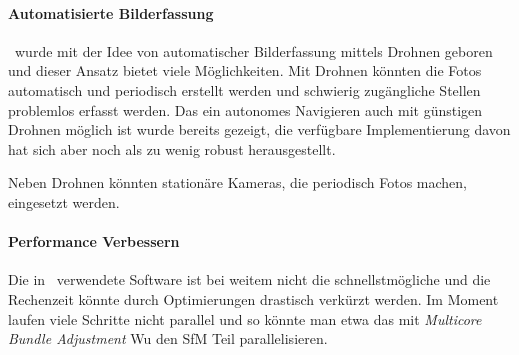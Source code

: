 		\paragraph{Automatisierte Bilderfassung}
			\dronarch\ wurde mit der Idee von automatischer Bilderfassung mittels Drohnen geboren und dieser Ansatz bietet viele Möglichkeiten. Mit Drohnen könnten die Fotos automatisch und periodisch erstellt werden und schwierig zugängliche Stellen problemlos erfasst werden. Das ein autonomes Navigieren auch mit günstigen Drohnen möglich ist wurde bereits gezeigt, die verfügbare Implementierung davon hat sich aber noch als zu wenig robust herausgestellt.
			
			Neben Drohnen könnten stationäre Kameras, die periodisch Fotos machen, eingesetzt werden.

		\paragraph{Performance Verbessern}
			Die in \dronarch\ verwendete Software ist bei weitem nicht die schnellstmögliche und die Rechenzeit könnte durch Optimierungen drastisch verkürzt werden. Im Moment laufen viele Schritte nicht parallel und so könnte man etwa das mit \emph{Multicore Bundle Adjustment} Wu \etal{} den SfM Teil parallelisieren.
	
